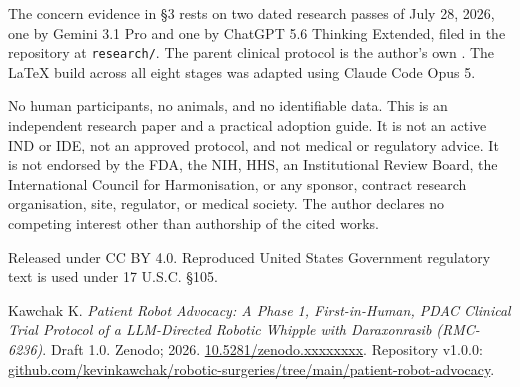 
The concern evidence in \S 3 rests on two dated research passes of July 28,
2026, one by Gemini 3.1 Pro and one by ChatGPT 5.6 Thinking Extended, filed in
the repository at \texttt{research/}. The parent clinical protocol is the
author's own \cite{onpremwhippl}. The LaTeX build across all eight stages was
adapted using Claude Code Opus 5.


No human participants, no animals, and no identifiable data. This is an
independent research paper and a practical adoption guide. It is not an active
IND or IDE, not an approved protocol, and not medical or regulatory advice. It
is not endorsed by the FDA, the NIH, HHS, an Institutional Review Board, the
International Council for Harmonisation, or any sponsor, contract research
organisation, site, regulator, or medical society. The author declares no
competing interest other than authorship of the cited works.


Released under CC BY 4.0. Reproduced United States Government regulatory text is
used under 17 U.S.C. \S 105.


\vspace{0.30em}

\noindent Kawchak K. \textit{Patient Robot Advocacy: A Phase 1, First-in-Human,
PDAC Clinical Trial Protocol of a LLM-Directed Robotic Whipple with Daraxonrasib
(RMC-6236)}. Draft 1.0. Zenodo; 2026.
\href{https://doi.org/10.5281/zenodo.xxxxxxxx}{10.5281/zenodo.xxxxxxxx}.
Repository v1.0.0:
\href{https://github.com/kevinkawchak/robotic-surgeries/tree/main/patient-robot-advocacy}{github.com/kevinkawchak/robotic-surgeries/tree/main/patient-robot-advocacy}.




